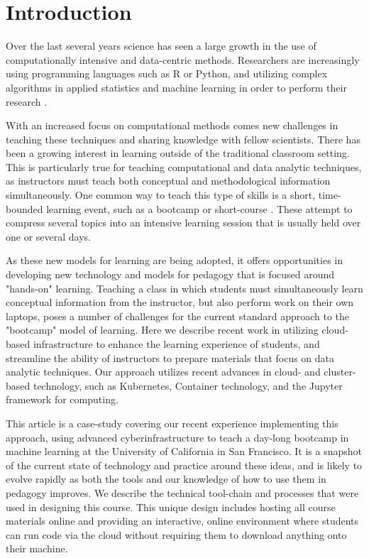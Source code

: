 \section{Introduction}

Over the last several years science has seen a large growth in the use of
computationally intensive and data-centric methods. Researchers are
increasingly using programming languages such as R or Python, and utilizing
complex algorithms in applied statistics and machine learning in order to
perform their research \cite{momcheva2015astro}.

With an increased focus on computational methods
comes new challenges in teaching these techniques and sharing
knowledge with fellow scientists. There has been a growing interest in learning
outside of the traditional classroom setting. This is particularly true
for teaching computational and data analytic techniques,
as instructors must teach both conceptual and methodological information
simultaneously. One common way to teach this type of skills is a short,
time-bounded learning event, such as a bootcamp or short-course
\cite{wilson2016software}. These attempt to compress several
topics into an intensive learning session that is usually held over one or
several days.

As these new models for learning are being adopted, it offers
opportunities in developing new technology and models for pedagogy that is
focused around "hands-on" learning. Teaching a class in which students
must simultaneously learn conceptual information from the instructor, but also
perform work on their own laptops, poses a number of challenges for the
current standard approach to the "bootcamp" model of learning. Here we describe
recent work in utilizing cloud-based infrastructure to enhance the learning
experience of students, and streamline the ability of instructors to
prepare materials that focus on data analytic techniques. Our approach
utilizes recent advances in cloud- and cluster- based technology, such
as Kubernetes, Container technology, and the Jupyter framework for computing.

This article is a case-study covering our recent experience implementing this approach, using
advanced cyberinfrastructure to teach a day-long bootcamp in machine learning at
the University of California in San Francisco. It is a snapshot of the current state
of technology and practice around these ideas, and is likely to evolve rapidly
as both the tools and our knowledge of how to use them in pedagogy improves.
We describe the technical tool-chain and processes that were used in
designing this course. This
unique design includes hosting all course materials online and providing
an interactive, online environment where students can run code via the cloud
without requiring them to download anything onto their machine.

